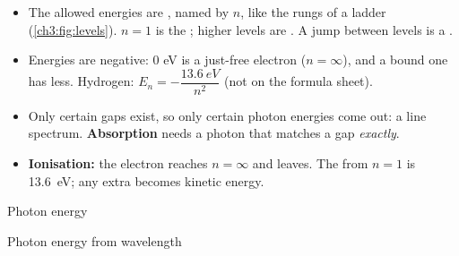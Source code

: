 \begin{itemize}
  \item The allowed energies are , named by $n$, like the rungs of a ladder
        (\cref{ch3:fig:levels}). $n = 1$ is the ; higher levels are
        . A jump between levels is a .
  \item Energies are negative: 0 eV is a just-free electron ($n = \infty$), and a bound one has
        less. Hydrogen: $E_n = -\dfrac{\qty{13.6}{eV}}{n^2}$ (not on the formula sheet).
  \item Only certain gaps exist, so only certain photon energies come out: a line spectrum.
        \textbf{Absorption} needs a photon that matches a gap \emph{exactly}.
  \item \textbf{Ionisation:} the electron reaches $n = \infty$ and leaves. The
         from $n = 1$ is \qty{13.6}{eV}; any extra becomes kinetic
        energy.
\end{itemize}

\begin{formulacard}{Photon energy}
  \begin{symbols}
  \end{symbols}
\end{formulacard}

\begin{formulacard}[combine={$E = hf$ and $v = f\lambda$}]{Photon energy from wavelength}
  \begin{symbols}
  \end{symbols}
\end{formulacard}


